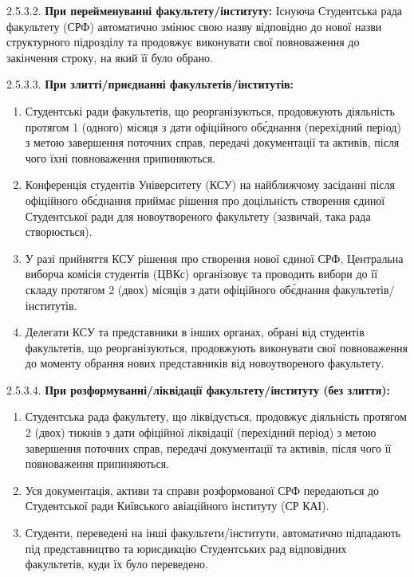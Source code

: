         2.5.3.2. \textbf{При перейменуванні факультету/інституту:} Існуюча Студентська рада факультету (СРФ) автоматично змінює свою назву відповідно до нової назви структурного підрозділу та продовжує виконувати свої повноваження до закінчення строку, на який її було обрано.

        2.5.3.3. \textbf{При злитті/приєднанні факультетів/інститутів:}
            \begin{enumerate}[label=\alph*)]
                \item Студентські ради факультетів, що реорганізуються, продовжують діяльність протягом 1 (одного) місяця з дати офіційного об\'єднання (перехідний період) з метою завершення поточних справ, передачі документації та активів, після чого їхні повноваження припиняються.
                \item Конференція студентів Університету (КСУ) на найближчому засіданні після офіційного об\'єднання приймає рішення про доцільність створення єдиної Студентської ради для новоутвореного факультету (зазвичай, така рада створюється).
                \item У разі прийняття КСУ рішення про створення нової єдиної СРФ, Центральна виборча комісія студентів (ЦВКс) організовує та проводить вибори до її складу протягом 2 (двох) місяців з дати офіційного об\'єднання факультетів/інститутів.
                \item Делегати КСУ та представники в інших органах, обрані від студентів факультетів, що реорганізуються, продовжують виконувати свої повноваження до моменту обрання нових представників від новоутвореного факультету.
            \end{enumerate}

        2.5.3.4. \textbf{При розформуванні/ліквідації факультету/інституту (без злиття):}
            \begin{enumerate}[label=\alph*)]
                \item Студентська рада факультету, що ліквідується, продовжує діяльність протягом 2 (двох) тижнів з дати офіційної ліквідації (перехідний період) з метою завершення поточних справ, передачі документації та активів, після чого її повноваження припиняються.
                \item Уся документація, активи та справи розформованої СРФ передаються до Студентської ради Київського авіаційного інституту (СР КАІ).
                \item Студенти, переведені на інші факультети/інститути, автоматично підпадають під представництво та юрисдикцію Студентських рад відповідних факультетів, куди їх було переведено.
            \end{enumerate}

